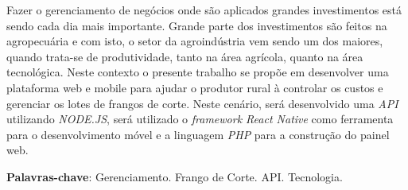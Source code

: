
\begin{resumo}[RESUMO]
\begin{SingleSpacing}


Fazer o gerenciamento de negócios onde são aplicados grandes investimentos está sendo cada dia mais importante. Grande parte dos investimentos são feitos na agropecuária e com isto, o setor da agroindústria vem sendo um dos maiores, quando trata-se de produtividade, tanto na área agrícola, quanto na área tecnológica. Neste contexto o presente trabalho se propõe em  desenvolver uma plataforma web e mobile para ajudar o produtor rural à controlar os custos e gerenciar os lotes de frangos de corte. Neste cenário, será desenvolvido uma \textit{API} utilizando \textit{NODE.JS}, será utilizado o \textit{framework React Native} como ferramenta para o desenvolvimento móvel e a linguagem \textit{PHP} para a construção do painel web. 


\textbf{Palavras-chave}: Gerenciamento. Frango de Corte. API. Tecnologia.

\end{SingleSpacing}
\end{resumo}

